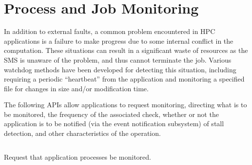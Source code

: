 \section{Process and Job Monitoring}
\label{chap:api_job_mgmt:monitor}

In addition to external faults, a common problem encountered in \ac{HPC} applications is a failure to make
progress due to some internal conflict in the computation. These situations can
result in a significant waste of resources as the \ac{SMS} is unaware of the problem, and thus cannot terminate the
job. Various watchdog methods have been developed for detecting this situation, including requiring a periodic ``heartbeat''
from the application and monitoring a specified file for changes in size and/or modification time.

The following \acp{API} allow applications to request monitoring, directing what is to be monitored, the frequency of the associated check, whether or not the application is to be notified (via the event notification subsystem) of stall detection, and other characteristics of the operation.

\subsection{}

\summary

Request that application processes be monitored.

\format


\begin{arglist}
\end{arglist}

